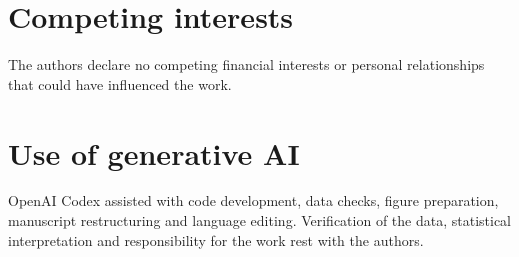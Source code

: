 \documentclass[11pt]{article}
\begin{document}
\section*{Competing interests}
The authors declare no competing financial interests or personal relationships that could have influenced the work.

\section*{Use of generative AI}
OpenAI Codex assisted with code development, data checks, figure preparation, manuscript restructuring and language editing. Verification of the data, statistical interpretation and responsibility for the work rest with the authors.



\end{document}
